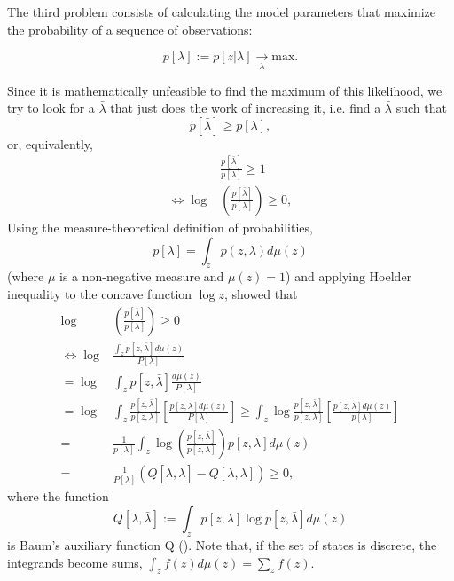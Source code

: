 \documentclass{article}
\begin{document}
The third problem consists of calculating the model parameters that maximize the probability of a sequence of observations:

\begin{equation}
p[\lambda] := p[z|\lambda]  \xrightarrow[\lambda]{}  \text{max}.
\end{equation} 

Since it is mathematically unfeasible to find the maximum of this likelihood, we try to look for a $\bar \lambda$ that just does the work of increasing it, i.e. find a $\bar \lambda$ such that
\begin{equation}
 p[\bar \lambda] \ge p[\lambda], 
\end{equation} or, equivalently,
\begin{equation}
\begin{split}
 &\frac{p[\bar \lambda]}{p[\lambda]} \ge 1 \\
 \Leftrightarrow
 \log &\left( \frac{p[\bar \lambda]}{p[\lambda]} \right) \ge 0,
\end{split}
\end{equation}
Using the measure-theoretical definition of probabilities, 
\begin{equation}
 p[\lambda] = \int_z p(z,\lambda) d\mu(z)
\end{equation} (where $\mu$ is a non-negative measure and $\mu (z) = 1$) and applying Hoelder inequality to the concave function 
$\log z $, \cite{baum72} showed that
\begin{equation}
\begin{split}
 \log &\left( \frac{p[\bar \lambda]}{p[\lambda]} \right) \ge 0 \\
 \Leftrightarrow 
 \log & \frac{\int_z p[z,\bar \lambda] d\mu(z)}{P[\lambda]} \\
 = \log & \int_z p[z,\bar \lambda] \frac{d\mu(z) }{P[\lambda]} \\
 = \log & \int_z \frac{p[z,\bar \lambda]}{p[z,\lambda]} \left[ \frac{p[z,\lambda]d\mu(z) }{P[\lambda]} \right] 
 \ge 
  \int_z \log \frac{p[z,\bar \lambda]}{p[z,\lambda]} \left[ \frac{p[z,\lambda]d\mu(z) }{p[\lambda]} \right] \\
 = & \frac{1}{p[\lambda]}  \int_z \log \left(\frac{p[z,\bar \lambda]}{p[z,\lambda]} \right) p[z,\lambda]d\mu(z) \\
 = & \frac{1}{P[\lambda]} \left( Q[\lambda, \bar\lambda ] - Q[\lambda,\lambda ] \right) \ge 0,
\end{split}
\end{equation}
where the function
\begin{equation}
Q[\lambda, \bar\lambda ] := \int_z p[z,\lambda]\log p[z,\bar \lambda]d\mu(z) 
\end{equation} is Baum's auxiliary function Q (\cite{baum72}). Note that, if the set of states is discrete, the integrands become sums, $\int_z f(z)d\mu (z) = \sum_z f(z)$.\newline
\end{document}
